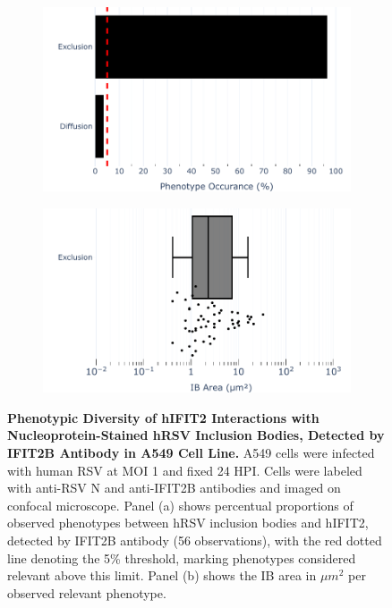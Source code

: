 \begin{figure}
    \begin{subfigure}{0.495\textwidth}
        \caption{}
        \includegraphics[width=1\linewidth]{08. Chapter 3/Figs/02. Infection/02. IFIT2/02. IFIT2B/01. bar_i2b_a549-n.pdf}
    \end{subfigure}
    \begin{subfigure}{0.495\textwidth}
        \caption{}
        \includegraphics[width=1\linewidth]{08. Chapter 3/Figs/02. Infection/02. IFIT2/02. IFIT2B/02. box_i2b_a549-n.pdf}
    \end{subfigure}
    \caption[Phenotypic Diversity of hIFIT2 Interactions with Nucleoprotein-Stained hRSV Inclusion Bodies, Detected by IFIT2B Antibody in A549 Cell Line.]{\textbf{Phenotypic Diversity of hIFIT2 Interactions with Nucleoprotein-Stained hRSV Inclusion Bodies, Detected by IFIT2B Antibody in A549 Cell Line.} A549 cells were infected with human RSV at MOI 1 and fixed 24 HPI. Cells were labeled with anti-RSV N and anti-IFIT2B antibodies and imaged on confocal microscope. Panel (a) shows percentual proportions of observed phenotypes between hRSV inclusion bodies and hIFIT2, detected by IFIT2B antibody (56 observations), with the red dotted line denoting the 5\% threshold, marking phenotypes considered relevant above this limit. Panel (b) shows the IB area in \(\mu m^2\) per observed relevant phenotype.}
    \label{fig:Phenotypic Diversity of hIFIT2 Interactions with Nucleoprotein-Stained hRSV Inclusion Bodies, Detected by IFIT2B Antibody in A549 Cell Line}
\end{figure}


